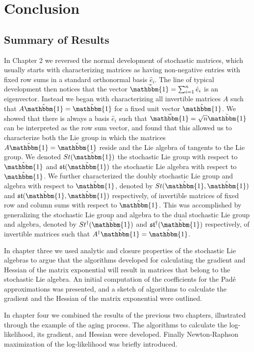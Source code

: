 \chapter{Conclusion}
\section{Summary of Results}
In Chapter 2 we reversed the normal development of stochastic matrices, which usually starts 
with characterizing matrices as having non-negative entries with fixed row sums in a
standard orthonormal basis $\hat{e}_i$. The line of typical development then notices that
the vector $\vec{\mathbbm{1}} = \sum_{i=1}^n \hat{e}_i$ is an eigenvector. Instead we began
with characterizing all invertible matrices $A$ such that $A \hat{\mathbbm{1}} = \hat{\mathbbm{1}}$
for a fixed unit vector $\hat{\mathbbm{1}}$. We showed that there is always a basis $\hat{e}_i$ 
such that $\vec{\mathbbm{1}} = \sqrt{n} \hat{\mathbbm{1}}$ can be interpreted as the row sum
vector, and found that this allowed us to characterize both the Lie group in which the 
matrices $A \hat{\mathbbm{1}} = \hat{\mathbbm{1}}$ reside and the Lie algebra of tangents to
the Lie group. We denoted $St(\hat{\mathbbm{1}})$ the stochastic Lie group with respect to $\hat{\mathbbm{1}}$ 
and $\mathfrak{st}(\hat{\mathbbm{1}})$ the stochastic Lie algebra with respect to $\hat{\mathbbm{1}}$. 
We further characterized the doubly stochastic Lie group and algebra with respect to $\hat{\mathbbm{1}}$, 
denoted by $St(\hat{\mathbbm{1}}, \hat{\mathbbm{1}})$ and $\mathfrak{st}(\hat{\mathbbm{1}}, \hat{\mathbbm{1}})$ 
respectively, of invertible matrices of fixed row and column sums with respect to $\hat{\mathbbm{1}}$. 
This was accomplished by generalizing the stochastic Lie group and algebra to the dual 
stochastic Lie group and algebra, denoted by $St^\dagger(\hat{\mathbbm{1}})$ and $\mathfrak{st}^\dagger(\hat{\mathbbm{1}})$ 
respectively, of invertible matrices such that $A^\dagger \hat{\mathbbm{1}} = \hat{\mathbbm{1}}$.

In chapter three we used analytic and closure properties of the stochastic Lie algebras to
argue that the algorithms developed for calculating the gradient and Hessian of the matrix
exponential will result in matrices that belong to the stochastic Lie algebra. An initial
computation of the coefficients for the Pad\'{e} approximations was presented, and a sketch
of algorithms to calculate the gradient and the Hessian of the matrix exponential were 
outlined.

In chapter four we combined the results of the previous two chapters, illustrated through
the example of the aging process. The algorithms to calculate the log-likelihood, its
gradient, and Hessian were developed. Finally Newton-Raphson maximization of the 
log-likelihood was briefly introduced.
